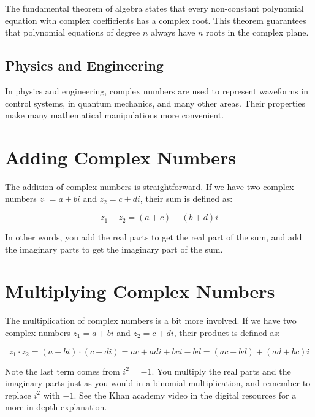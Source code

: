 The fundamental theorem of algebra states that every non-constant
polynomial equation with complex coefficients has a complex root. This
theorem guarantees that polynomial equations of degree $n$ always have
$n$ roots in the complex plane.

\subsection{Physics and Engineering}

In physics and engineering, complex numbers are used to represent
waveforms in control systems, in quantum mechanics, and many other
areas. Their properties make many mathematical manipulations more
convenient.

\section{Adding Complex Numbers}

The addition of complex numbers is straightforward. If we have two
complex numbers $z_1 = a + bi$ and $z_2 = c + di$, their sum is
defined as:

\begin{equation}
z_1 + z_2 = (a + c) + (b + d)i
\end{equation}

In other words, you add the real parts to get the real part of the
sum, and add the imaginary parts to get the imaginary part of the sum.

\section{Multiplying Complex Numbers}

The multiplication of complex numbers is a bit more involved. If we
have two complex numbers $z_1 = a + bi$ and $z_2 = c + di$, their
product is defined as:

\begin{equation}
z_1 \cdot z_2 = (a + bi) \cdot (c + di) = ac + adi + bci - bd = (ac - bd) + (ad + bc)i
\end{equation}

Note the last term comes from $i^2 = -1$. You multiply the real parts
and the imaginary parts just as you would in a binomial
multiplication, and remember to replace $i^2$ with $-1$. See the Khan academy video
in the digital resources for a more in-depth explanation.

